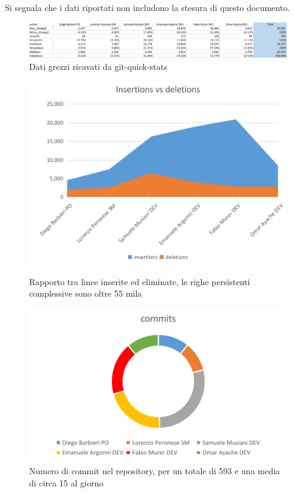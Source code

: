 \documentclass{article}
\begin{document}
Si segnala che i dati riportati non includono la stesura di questo documento.

\begin{figure}[H] 
    \centering 
    \includegraphics[width=\textwidth]{report-stats_raw} 
    \caption{Dati grezzi ricavati da git-quick-stats} 
    \label{fig:stats_raw} 
\end{figure}

\begin{figure}[H] 
    \centering 
    \begin{minipage}[t]{0.44\textwidth} 
        \centering 
        \includegraphics[width=\textwidth]{report-stats_insdel} 
        \caption{Rapporto tra linee inserite ed eliminate, le righe persistenti complessive sono oltre 55 mila} 
        \label{fig:stats_insdel} 
    \end{minipage} 
    \hfill 
    \begin{minipage}[t]{0.51\textwidth} 
        \centering 
        \includegraphics[width=\textwidth]{report-stats_commits} 
        \caption{Numero di commit nel repository, per un totale di 593 e una media di circa 15 al giorno} 
        \label{fig:stats_commits} 
    \end{minipage}
\end{figure}
\end{document}
